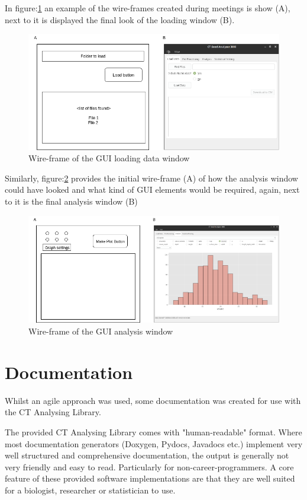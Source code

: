 \documentclass[11pt]{report}
\begin{document}
In figure:\ref{fig:orgde08609} an example of the wire-frames created during meetings is show (A), next to it is displayed the final look of the loading window (B).
\begin{figure}[htbp]
\centering
\includegraphics[width=16cm]{./images/wireframe1.png}
\caption{\label{fig:orgde08609}
Wire-frame of the GUI loading data window}
\end{figure}

Similarly, figure:\ref{fig:org66ff531} provides the initial wire-frame (A) of how the analysis window could have looked and what kind of GUI elements would be required, again, next to it is the final analysis window (B)
\begin{figure}[htbp]
\centering
\includegraphics[width=16cm]{./images/wireframe2.png}
\caption{\label{fig:org66ff531}
Wire-frame of the GUI analysis window}
\end{figure}
\section{Documentation}
\label{sec:org8ec98c8}
Whilst an agile approach was used, some documentation was created for use with the CT Analysing Library.

The provided CT Analysing Library comes with "human-readable" format. Where most documentation generators (Doxygen, Pydocs, Javadocs etc.) implement very well structured and comprehensive documentation, the output is generally not very friendly and easy to read. Particularly for non-career-programmers. A core feature of these provided software implementations are that they are well suited for a biologist, researcher or statistician to use.
\end{document}
